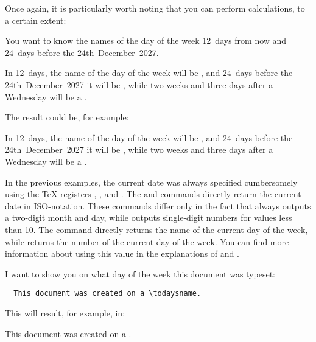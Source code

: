 Once again, it is particularly worth noting that you can perform calculations,
to a certain extent:
\begin{Example}
  You want to know the names of the day of the week 12~days from now
  and 24~days before the 24th~December~2027.
\begin{lstcode}
  In 12~days, the name of the day of the week
  will be , and
  24~days before the 24th~December~2027 it will be
  , while two weeks
  and three days after a Wednesday will be a
  .
\end{lstcode}
  The result could be, for example:
  \begin{ShowOutput}
    In 12~days, the name of the day of the week
    will be , and
    24~days before the 24th~December~2027 it will be
    , while two weeks
    and three days after a Wednesday will be a
    .
  \end{ShowOutput}
\end{Example}%
%
\EndIndexGroup


\begin{Declaration}
\end{Declaration}%
In the previous examples, the current date was always specified cumbersomely
using the \TeX{} registers ,
, and . The
 and 
commands directly return the current date in ISO-notation. These commands
differ only in the fact that  always outputs a two-digit month
and day, while  outputs single-digit numbers for values less
than 10. The  command directly returns the name of the
current day of the week, while  returns the number of the
current day of the week. You can find more information about using this value
in the explanations of  and
.

\begin{Example}
  I want to show you on what day of the week this document was typeset:
\begin{lstlisting}
  This document was created on a \todaysname.
\end{lstlisting}
  This will result, for example, in:
  \begin{ShowOutput}
    This document was created on a \todaysname.
  \end{ShowOutput}
\end{Example}


